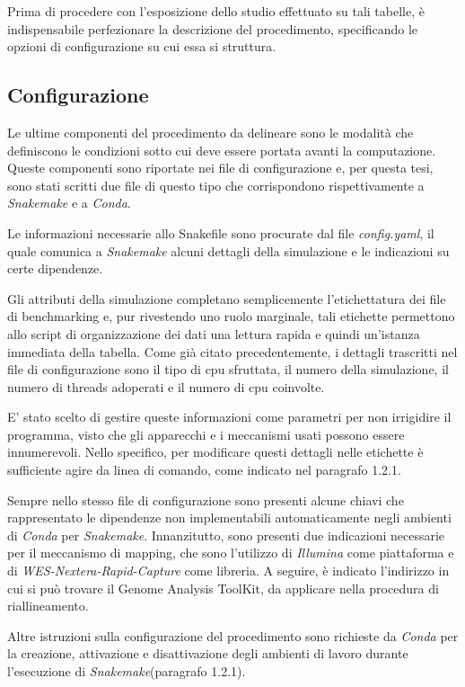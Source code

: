 Prima di procedere con l'esposizione dello studio effettuato su tali tabelle, è indispensabile perfezionare la descrizione del procedimento, specificando le opzioni di configurazione su cui essa si struttura.


\subsection{Configurazione}
Le ultime componenti del procedimento da delineare sono le modalità che definiscono le condizioni sotto cui deve essere portata avanti la computazione.
Queste componenti sono riportate nei file di configurazione e, per questa tesi, sono stati scritti due file di questo tipo che corrispondono rispettivamente a \textit{Snakemake} e a \textit{Conda}.

Le informazioni necessarie allo Snakefile sono procurate dal file \textit{config.yaml}, il quale comunica a \textit{Snakemake} alcuni dettagli della simulazione e le indicazioni su certe dipendenze.


Gli attributi della simulazione completano semplicemente l'etichettatura dei file di benchmarking e, pur rivestendo uno ruolo marginale, tali etichette permettono allo script di organizzazione dei dati una lettura rapida e quindi un'istanza immediata della tabella.
Come già citato precedentemente, i dettagli trascritti nel file di configurazione sono il tipo di cpu sfruttata, il numero della simulazione, il numero di threads adoperati e il numero di cpu coinvolte.

E' stato scelto di gestire queste informazioni come parametri per non irrigidire il programma, visto che gli apparecchi e i meccanismi usati possono essere innumerevoli.
Nello specifico, per modificare questi dettagli nelle etichette è sufficiente agire da linea di comando, come indicato nel paragrafo 1.2.1.

Sempre nello stesso file di configurazione sono presenti alcune chiavi che rappresentato le dipendenze non implementabili automaticamente negli ambienti di \textit{Conda} per \textit{Snakemake}.
Innanzitutto, sono presenti due indicazioni necessarie per il meccanismo di mapping, che sono l'utilizzo di \textit{Illumina} come piattaforma e di \textit{WES-Nextera-Rapid-Capture} come libreria.
A seguire, è indicato l'indirizzo in cui si può trovare il Genome Analysis ToolKit, da applicare nella procedura di riallineamento.

Altre istruzioni sulla configurazione del procedimento sono richieste da \textit{Conda} per la creazione, attivazione e disattivazione degli ambienti di lavoro durante l'esecuzione di \textit{Snakemake}(paragrafo 1.2.1).

